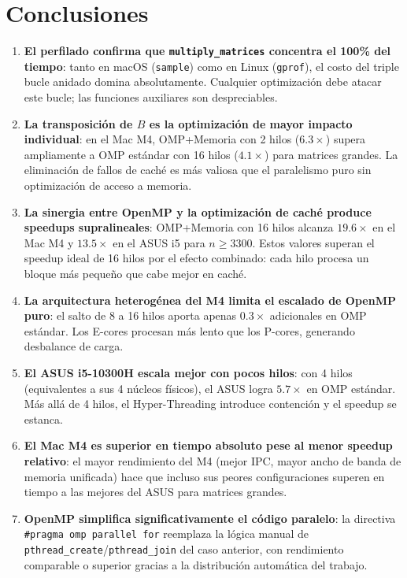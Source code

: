 \documentclass{article}
\begin{document}
\section{Conclusiones}

\begin{enumerate}

    \item \textbf{El perfilado confirma que \texttt{multiply\_matrices} concentra el 100\% del tiempo}: tanto en macOS (\texttt{sample}) como en Linux (\texttt{gprof}), el costo del triple bucle anidado domina absolutamente. Cualquier optimización debe atacar este bucle; las funciones auxiliares son despreciables.

    \item \textbf{La transposición de $B$ es la optimización de mayor impacto individual}: en el Mac M4, OMP+Memoria con 2 hilos ($6.3\times$) supera ampliamente a OMP estándar con 16 hilos ($4.1\times$) para matrices grandes. La eliminación de fallos de caché es más valiosa que el paralelismo puro sin optimización de acceso a memoria.

    \item \textbf{La sinergia entre OpenMP y la optimización de caché produce speedups supralineales}: OMP+Memoria con 16 hilos alcanza $19.6\times$ en el Mac M4 y $13.5\times$ en el ASUS i5 para $n \geq 3300$. Estos valores superan el speedup ideal de 16 hilos por el efecto combinado: cada hilo procesa un bloque más pequeño que cabe mejor en caché.

    \item \textbf{La arquitectura heterogénea del M4 limita el escalado de OpenMP puro}: el salto de 8 a 16 hilos aporta apenas $0.3\times$ adicionales en OMP estándar. Los E-cores procesan más lento que los P-cores, generando desbalance de carga.

    \item \textbf{El ASUS i5-10300H escala mejor con pocos hilos}: con 4 hilos (equivalentes a sus 4 núcleos físicos), el ASUS logra $5.7\times$ en OMP estándar. Más allá de 4 hilos, el Hyper-Threading introduce contención y el speedup se estanca.

    \item \textbf{El Mac M4 es superior en tiempo absoluto pese al menor speedup relativo}: el mayor rendimiento del M4 (mejor IPC, mayor ancho de banda de memoria unificada) hace que incluso sus peores configuraciones superen en tiempo a las mejores del ASUS para matrices grandes.

    \item \textbf{OpenMP simplifica significativamente el código paralelo}: la directiva \texttt{\#pragma omp parallel for} reemplaza la lógica manual de \texttt{pthread\_create}/\texttt{pthread\_join} del caso anterior, con rendimiento comparable o superior gracias a la distribución automática del trabajo.

\end{enumerate}
\end{document}
